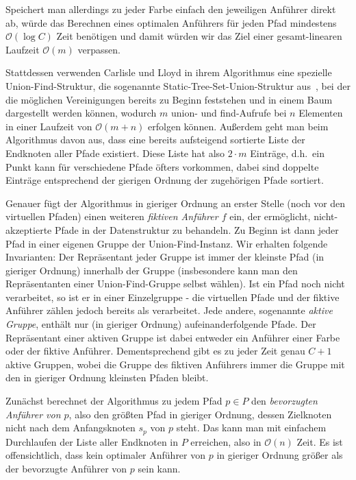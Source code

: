 Speichert man allerdings zu jeder Farbe einfach den jeweiligen Anführer direkt ab, würde das Berechnen eines optimalen
Anführers für jeden Pfad mindestens $\mathcal O(\log C)$ Zeit benötigen und damit würden wir das Ziel einer gesamt-linearen Laufzeit
$\mathcal O(m)$ verpassen.

Stattdessen verwenden Carlisle und Lloyd in ihrem Algorithmus eine spezielle Union-Find-Struktur, die sogenannte
Static-Tree-Set-Union-Struktur aus~\cite{static-tree-set-union}, bei der die möglichen Vereinigungen bereits zu Beginn feststehen und in einem Baum
dargestellt werden können, wodurch $m$ union- und find-Aufrufe bei $n$ Elementen in einer Laufzeit von $\mathcal O(m + n)$ erfolgen können.
Außerdem geht man beim Algorithmus davon aus, dass eine bereits aufsteigend sortierte Liste der Endknoten aller Pfade existiert.
Diese Liste hat also $2\cdot m$ Einträge, d.h.\ ein Punkt kann für verschiedene Pfade öfters vorkommen, dabei sind doppelte Einträge entsprechend der gierigen
Ordnung der zugehörigen Pfade sortiert.

Genauer fügt der Algorithmus in gieriger Ordnung an erster Stelle (noch vor den virtuellen Pfaden) einen weiteren {\em fiktiven Anführer $f$}
ein, der ermöglicht, nicht-akzeptierte Pfade in der Datenstruktur zu behandeln.
Zu Beginn ist dann jeder Pfad in einer eigenen Gruppe der Union-Find-Instanz.
Wir erhalten folgende Invarianten:
Der Repräsentant jeder Gruppe ist immer der kleinste Pfad (in gieriger Ordnung) innerhalb der Gruppe (insbesondere kann man den Repräsentanten einer Union-Find-Gruppe selbst wählen).
Ist ein Pfad noch nicht verarbeitet, so ist er in einer Einzelgruppe - die virtuellen Pfade und der fiktive Anführer
zählen jedoch bereits als verarbeitet.
Jede andere, sogenannte {\em aktive Gruppe}, enthält nur (in gieriger Ordnung) aufeinanderfolgende Pfade.
Der Repräsentant einer aktiven Gruppe ist dabei entweder ein Anführer einer Farbe oder der fiktive Anführer.
Dementsprechend gibt es zu jeder Zeit genau $C+1$ aktive Gruppen, wobei die Gruppe des fiktiven
Anführers immer die Gruppe mit den in gieriger Ordnung kleinsten Pfaden bleibt.

Zunächst berechnet der Algorithmus zu jedem Pfad $p \in P$ den {\em bevorzugten Anführer von $p$}, also den größten Pfad
in gieriger Ordnung, dessen Zielknoten nicht nach dem Anfangsknoten $s_p$ von $p$ steht.
Das kann man mit einfachem Durchlaufen der Liste aller Endknoten in $P$ erreichen, also in $\mathcal O(n)$ Zeit.
Es ist offensichtlich, dass kein optimaler Anführer von $p$ in gieriger Ordnung größer als der bevorzugte Anführer von
$p$ sein kann.

